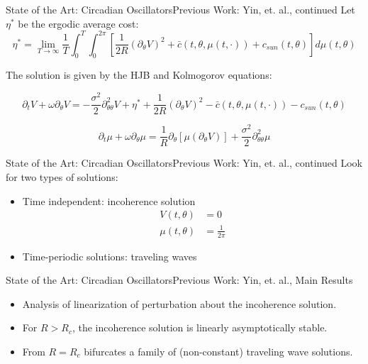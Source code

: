 \documentclass{beamer}
\begin{document}
\begin{frame}{State of the Art: Circadian Oscillators}{Previous Work: Yin, et. al., continued}
	Let $\eta^*$ be the ergodic average cost:
	\begin{equation}
	\eta^*=\lim_{T \rightarrow \infty} \frac{1}{T} \int_0^T \int_0^{2\pi} \left[\frac{1}{2R}(\partial_\theta V)^2+\bar{c}(t,\theta,\mu(t,\cdot))+c_{sun}(t,\theta) \right] d\mu(t,\theta)
	\end{equation}
	
	The solution is given by the HJB and Kolmogorov equations:
	
	\begin{equation}
	\partial_t V+\omega \partial_\theta V=-\frac{\sigma^2}{2}\partial_{\theta \theta}^2 V+\eta^*+\frac{1}{2R}(\partial_\theta V)^2-\bar{c}(t,\theta,\mu(t,\cdot))-c_{sun}(t,\theta)
	\label{HJB}
	\end{equation}
	
	\begin{equation}
	\partial_t \mu+\omega \partial_{\theta} \mu= \frac{1}{R} \partial_{\theta}\left[\mu(\partial_\theta V) \right]+ \frac{\sigma^2}{2} \partial_{\theta \theta}^2 \mu
	\label{Kolmogorov}
	\end{equation}
\end{frame}

\begin{frame}{State of the Art: Circadian Oscillators}{Previous Work: Yin, et. al., continued}
Look for two types of solutions:
\begin{itemize}
	\item Time independent: incoherence solution
	\begin{equation}
	\begin{split}
		V(t,\theta)&=0 \\
		\mu(t,\theta)&=\frac{1}{2\pi}
	\end{split}
	\end{equation}
	\item Time-periodic solutions: traveling waves
\end{itemize}
\end{frame}

\begin{frame}{State of the Art: Circadian Oscillators}{Previous Work: Yin, et. al., Main Results}
	\begin{itemize}
		\item Analysis of linearization of perturbation about the incoherence solution.
		\item For $R>R_c$, the incoherence solution is linearly asymptotically stable.
		\item From $R=R_c$ bifurcates a family of (non-constant) traveling wave solutions.
	\end{itemize}
\end{frame}
\end{document}
